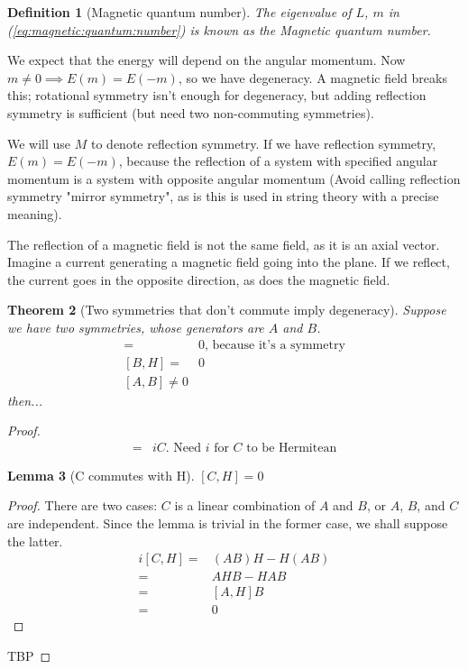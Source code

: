 \documentclass[]{article}
\newtheorem{thm}{Theorem}
\newtheorem{defn}[thm]{Definition}
\newtheorem{lemma}[thm]{Lemma}
\begin{document}
\begin{defn}[Magnetic quantum number]
	The eigenvalue of $L$, $m$ in (\ref{eq:magnetic:quantum:number}) is known as the Magnetic quantum number.
\end{defn}

We expect that the energy will depend on the angular momentum. Now $m\ne 0 \implies E(m)=E(-m)$, so we have degeneracy. A magnetic field breaks this; rotational symmetry isn't enough for degeneracy, but adding reflection symmetry is sufficient (but need two non-commuting symmetries).

We will use $M$ to denote reflection symmetry. If we have reflection symmetry, $E(m)=E(-m)$, because the reflection of a system with specified angular momentum is a system with opposite angular momentum (Avoid calling reflection symmetry "mirror symmetry", as is this is used in string theory with a precise meaning).

The reflection of a magnetic field is not the same field, as it is an axial vector. Imagine a current generating a magnetic field going into the plane. If we reflect, the current goes in the opposite direction, as does the magnetic field.

\begin{thm}[Two symmetries that don't commute imply degeneracy]
	Suppose we have two symmetries, whose generators are $A$ and $B$.
	\begin{align*}
		[A,H]=&0 \text{, because it's a symmetry}\\
		[B,H]=& 0\\
		[A,B]\ne 0
	\end{align*}
	then...
\end{thm}
\begin{proof}
	\begin{align*}
		[A,B]=& i C  \text{. Need $i$ for $C$ to be Hermitean}
	\end{align*}
	\begin{lemma}[C commutes with H]
		$[C,H]=0$
	\end{lemma}
	\begin{proof}
		There are two cases: $C$ is a linear combination of $A$ and $B$, or $A$, $B$, and $C$ are independent. Since the lemma is trivial in the former case, we shall suppose the latter.
		\begin{align*}
		i[C,H] =& (AB)H - H(AB)\\
		=& AHB -HAB\\
		=& [A,H]B\\
		=&0
		\end{align*}
	\end{proof}
	
	TBP
\end{proof}
\end{document}
